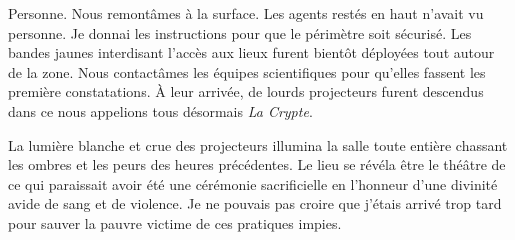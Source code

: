 Personne. Nous remontâmes à la surface. Les agents restés en haut n'avait vu personne. Je donnai les instructions pour 
que le périmètre soit sécurisé. Les bandes jaunes interdisant l'accès aux lieux furent bientôt déployées tout autour 
de la zone. Nous contactâmes les équipes scientifiques pour qu'elles fassent les première constatations. À leur 
arrivée, de lourds projecteurs furent descendus dans ce nous appelions tous désormais \emph{La Crypte}.

La lumière blanche et crue des projecteurs illumina la salle toute entière chassant les ombres et les peurs des heures 
précédentes. Le lieu se révéla être le théâtre de ce qui paraissait avoir été une cérémonie sacrificielle en l'honneur 
d'une divinité avide de sang et de violence. Je ne pouvais pas croire que j'étais arrivé trop tard pour sauver la 
pauvre victime de ces pratiques impies. 









